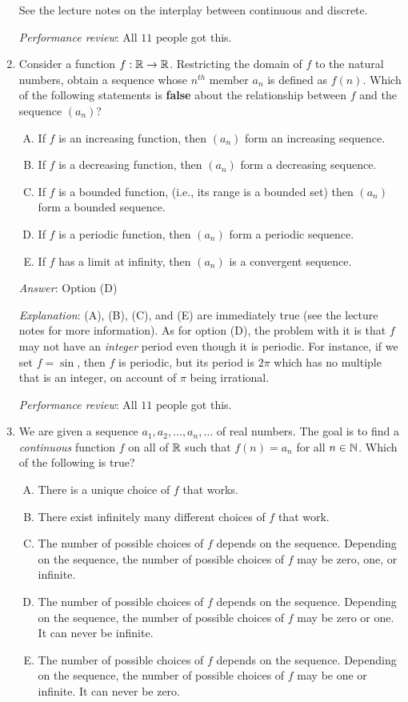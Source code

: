 \documentclass[10pt]{amsart}
\begin{document}
\begin{enumerate}
  See the lecture notes on the interplay between continuous and
  discrete.

  {\em Performance review}: All $11$ people got this.

\item Consider a function $f:\mathbb{R} \to \mathbb{R}$. Restricting the
  domain of $f$ to the natural numbers, obtain a sequence whose
  $n^{th}$ member $a_n$ is defined as $f(n)$. Which of the following
  statements is {\bf false} about the relationship between $f$ and the
  sequence $(a_n)$?

  \begin{enumerate}[(A)]
  \item If $f$ is an increasing function, then $(a_n)$ form an
    increasing sequence.
  \item If $f$ is a decreasing function, then $(a_n)$ form a
    decreasing sequence.
  \item If $f$ is a bounded function, (i.e., its range is a bounded
    set) then $(a_n)$ form a bounded sequence.
  \item If $f$ is a periodic function, then $(a_n)$ form a periodic sequence.
  \item If $f$ has a limit at infinity, then $(a_n)$ is a convergent
    sequence.
  \end{enumerate}

  {\em Answer}: Option (D)

  {\em Explanation}: (A), (B), (C), and (E) are immediately true (see
  the lecture notes for more information). As for option (D), the
  problem with it is that $f$ may not have an {\em integer} period
  even though it is periodic. For instance, if we set $f = \sin$, then
  $f$ is periodic, but its period is $2\pi$ which has no multiple that
  is an integer, on account of $\pi$ being irrational.

  {\em Performance review}: All $11$ people got this.

\item We are given a sequence $a_1, a_2, \dots, a_n, \dots$ of real
  numbers. The goal is to find a {\em continuous} function $f$ on all
  of $\mathbb{R}$ such that $f(n) = a_n$ for all $n \in \mathbb{N}$. Which of the
  following is true?

  \begin{enumerate}[(A)]
  \item There is a unique choice of $f$ that works.
  \item There exist infinitely many different choices of $f$ that work.
  \item The number of possible choices of $f$ depends on the
    sequence. Depending on the sequence, the number of possible
    choices of $f$ may be zero, one, or infinite.
  \item The number of possible choices of $f$ depends on the
    sequence. Depending on the sequence, the number of possible
    choices of $f$ may be zero or one. It can never be infinite.
  \item The number of possible choices of $f$ depends on the
    sequence. Depending on the sequence, the number of possible
    choices of $f$ may be one or infinite. It can never be zero.
  \end{enumerate}


\end{enumerate}
\end{document}
